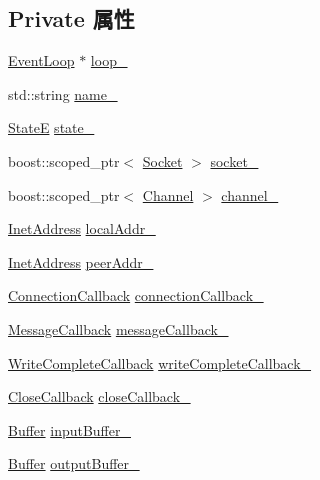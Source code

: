 \subsection*{Private 属性}
\begin{DoxyCompactItemize}
\item 
\hyperlink{classmuduo_1_1EventLoop}{Event\+Loop} $\ast$ \hyperlink{classmuduo_1_1TcpConnection_a19968f50018d32ac31f5cba0195591ac}{loop\+\_\+}
\item 
std\+::string \hyperlink{classmuduo_1_1TcpConnection_a4d739cc5d335052eb9f5b2ca559b81d1}{name\+\_\+}
\item 
\hyperlink{classmuduo_1_1TcpConnection_a8cf72f776f4277c8138a1beaf5185325}{StateE} \hyperlink{classmuduo_1_1TcpConnection_a4cfda1cf6d6cc44073a58722892cca7d}{state\+\_\+}
\item 
boost\+::scoped\+\_\+ptr$<$ \hyperlink{classmuduo_1_1Socket}{Socket} $>$ \hyperlink{classmuduo_1_1TcpConnection_a04b0eb0634ca50ba319f5e3d4951cf1e}{socket\+\_\+}
\item 
boost\+::scoped\+\_\+ptr$<$ \hyperlink{classmuduo_1_1Channel}{Channel} $>$ \hyperlink{classmuduo_1_1TcpConnection_a8375a127884b4155e4d0ff8604bb0b9a}{channel\+\_\+}
\item 
\hyperlink{classmuduo_1_1InetAddress}{Inet\+Address} \hyperlink{classmuduo_1_1TcpConnection_ab1f75b2e53bfd9586451a95375c1cdb2}{local\+Addr\+\_\+}
\item 
\hyperlink{classmuduo_1_1InetAddress}{Inet\+Address} \hyperlink{classmuduo_1_1TcpConnection_ae54e60de63b7e7837c536c8ff44c3070}{peer\+Addr\+\_\+}
\item 
\hyperlink{namespacemuduo_ac7f7b0c9c9e96123dfea3fe120a2c404}{Connection\+Callback} \hyperlink{classmuduo_1_1TcpConnection_ae4ac7fea1abbcfb56d481dbe8ffb37e7}{connection\+Callback\+\_\+}
\item 
\hyperlink{namespacemuduo_ab8a96fa483cffe150618e01058e6fc1b}{Message\+Callback} \hyperlink{classmuduo_1_1TcpConnection_aa4d5ea21d215329779698e634e5e7755}{message\+Callback\+\_\+}
\item 
\hyperlink{namespacemuduo_a605eda27d048a69607942b95735d7087}{Write\+Complete\+Callback} \hyperlink{classmuduo_1_1TcpConnection_a525f0d11cfa2e271600caa30407b6150}{write\+Complete\+Callback\+\_\+}
\item 
\hyperlink{namespacemuduo_ab2469aa3fe08794ee43a3d8f69bff30f}{Close\+Callback} \hyperlink{classmuduo_1_1TcpConnection_af4ea87dce1e6aaa022507ff52bc7360b}{close\+Callback\+\_\+}
\item 
\hyperlink{classmuduo_1_1Buffer}{Buffer} \hyperlink{classmuduo_1_1TcpConnection_a5466c35e5bfc020933095af435e30c80}{input\+Buffer\+\_\+}
\item 
\hyperlink{classmuduo_1_1Buffer}{Buffer} \hyperlink{classmuduo_1_1TcpConnection_a0de4fbd6e5608f695dd0b9f02897f297}{output\+Buffer\+\_\+}
\end{DoxyCompactItemize}


